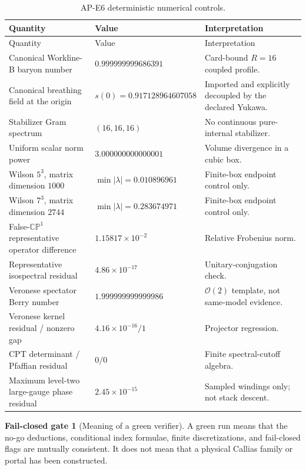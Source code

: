 \documentclass[11pt]{article}
\theoremstyle{definition}
\newtheorem{gate}[theorem]{Fail-closed gate}
\theoremstyle{remark}
\newcommand{\CP}{\mathbb {CP}}
\newcommand{\cO}{\mathcal O}
\begin{document}
\begin{longtable}{@{}L{0.43\textwidth}L{0.22\textwidth}L{0.27\textwidth}@{}}
\caption{AP-E6 deterministic numerical controls.}
\label{tab:numerics}\\
\toprule
Quantity & Value & Interpretation\\
\midrule
\endfirsthead
\toprule
Quantity & Value & Interpretation\\
\midrule
\endhead
Canonical Workline-B baryon number
 & \(0.999999999686391\)
 & Card-bound \(R=16\) coupled profile.\\
Canonical breathing field at the origin
 & \(s(0)=0.917128964607058\)
 & Imported and explicitly decoupled by the declared Yukawa.\\
Stabilizer Gram spectrum
 & \((16,16,16)\)
 & No continuous pure-internal stabilizer.\\
Uniform scalar norm power
 & \(3.000000000000001\)
 & Volume divergence in a cubic box.\\
Wilson \(5^3\), matrix dimension \(1000\)
 & \(\min|\lambda|=0.010896961\)
 & Finite-box endpoint control only.\\
Wilson \(7^3\), matrix dimension \(2744\)
 & \(\min|\lambda|=0.283674971\)
 & Finite-box endpoint control only.\\
False-\(\CP^1\) representative operator difference
 & \(1.15817\times10^{-2}\)
 & Relative Frobenius norm.\\
Representative isospectral residual
 & \(4.86\times10^{-17}\)
 & Unitary-conjugation check.\\
Veronese spectator Berry number
 & \(1.999999999999986\)
 & \(\cO(2)\) template, not same-model evidence.\\
Veronese kernel residual / nonzero gap
 & \(4.16\times10^{-16}/1\)
 & Projector regression.\\
CPT determinant / Pfaffian residual
 & \(0/0\)
 & Finite spectral-cutoff algebra.\\
Maximum level-two large-gauge phase residual
 & \(2.45\times10^{-15}\)
 & Sampled windings only; not stack descent.\\
\bottomrule
\end{longtable}

\begin{gate}[Meaning of a green verifier]
A green run means that the no-go deductions, conditional index formulae,
finite discretizations, and fail-closed flags are mutually consistent.  It
does not mean that a physical Callias family or portal has been constructed.
\end{gate}
\end{document}
